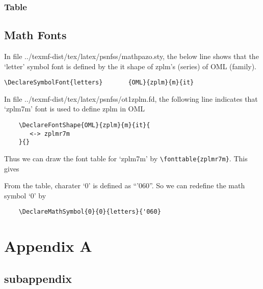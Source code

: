 \documentclass[10pt,a4paper,extrafontsizes,oldfontcommands,oneside]{memoir}
\begin{document}
\subsection{Table} %
\label{sub:table3}

\clearpage
\section{Math Fonts}

In file ../texmf-dist/tex/latex/psnfss/mathpazo.sty, the below line shows that the `letter' symbol font is defined by the it shape of zplm's (series) of OML (family).
\begin{verbatim}
\DeclareSymbolFont{letters}       {OML}{zplm}{m}{it}
\end{verbatim}

In file ../texmf-dist/tex/latex/psnfss/ot1zplm.fd, the following line indicates that `zplm7m' font is used to define zplm in OML
\begin{verbatim}
	\DeclareFontShape{OML}{zplm}{m}{it}{
	   <-> zplmr7m
	}{}
\end{verbatim}

Thus we can draw the font table for `zplm7m' by \verb+\fonttable{zplmr7m}+. This gives

From the table, charater `0' is defined as ``'060''. So we can redefine the math symbol `0' by
\begin{verbatim}
	\DeclareMathSymbol{0}{0}{letters}{'060}
\end{verbatim}

\clearpage

\appendix

\chapter{Appendix A} %
\label{chap:appendix_a}

\section{subappendix} %
\label{sec:subappendix}



\backmatter


\printbibliography
\end{document}
